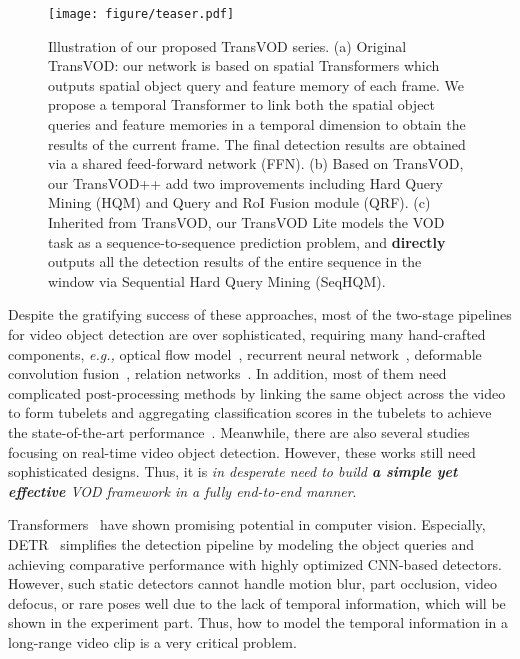 \documentclass[10pt,journal,compsoc]{IEEEtran}
\begin{document}
\begin{figure*}[t]
    \centering
    \texttt{[image: figure/teaser.pdf]} 
    \caption{\small Illustration of our proposed TransVOD series. (a) Original TransVOD: our network is based on spatial Transformers which outputs spatial object query and feature memory of each frame. We propose a temporal Transformer to link both the spatial object queries and feature memories in a temporal dimension to obtain the results of the current frame. The final detection results are obtained via a shared feed-forward network (FFN).
    (b) Based on TransVOD, our TransVOD++ add two improvements including Hard Query Mining (HQM) and Query and RoI Fusion module (QRF). (c) Inherited from TransVOD, our TransVOD Lite models the VOD task as a sequence-to-sequence prediction problem, and \textbf{directly} outputs all the detection results of the entire sequence in the window via Sequential Hard Query Mining (SeqHQM).}
    \label{fig:teaser_arch}
    \vspace{-3mm}
\end{figure*}

Despite the gratifying success of these approaches, most of the two-stage pipelines for video object detection are over sophisticated, requiring many hand-crafted components, \emph{e.g.,} optical flow model~\cite{zhu17dff,zhu17fgfa,wang18manet,zhu18hp,jin2022feature}, recurrent neural network~\cite{deng2019ogemn,chen2020memory,guo2019progressive}, deformable convolution fusion~\cite{bertasius18stsn,jiang2019video,he2020temporal}, relation networks~\cite{deng19rdn,chen2020memory,shvets19lltr}. In addition, most of them need complicated post-processing methods by linking the same object across the video to form tubelets and aggregating classification scores in the tubelets to achieve the state-of-the-art performance~\cite{han2016seq,kang2017t,belhassen2019improving,sabater2020robust}. 
Meanwhile, there are also several studies~\cite{liu2019looking,liu2018mobile,Chen2018OptimizingVOD,jiang2019video,jiang2020learning,yao2020video} focusing on real-time video object detection. However, these works still need sophisticated designs. Thus, it is \textit{in desperate need to build \textbf{a simple yet effective} VOD framework in a fully end-to-end manner}. 

Transformers~\cite{wang2020end,detr,zhu2020deformable,dosovitskiy2020image,sun2020transtrack} have shown promising potential in computer vision. Especially, DETR~\cite{detr,zhu2020deformable} simplifies the detection pipeline by modeling the object queries and achieving comparative performance with highly optimized CNN-based detectors. However, such static detectors cannot handle motion blur, part occlusion, video defocus, or rare poses well due to the lack of temporal information, which will be shown in the experiment part. Thus, how to model the temporal information in a long-range video clip is a very critical problem. 
\end{document}
